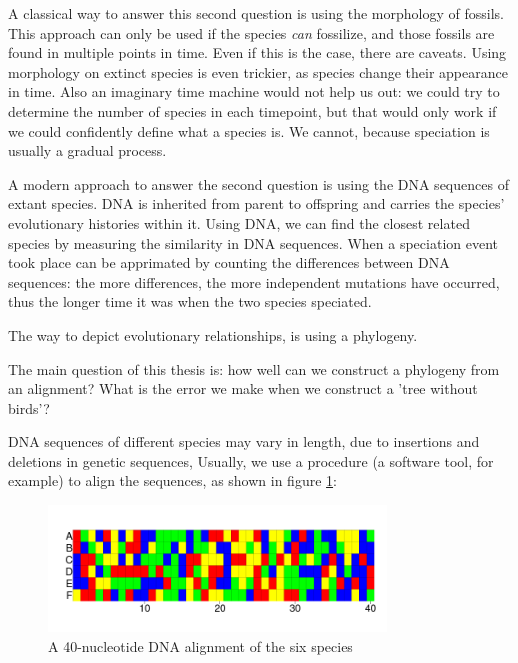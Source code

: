A classical way to answer this second question is using the morphology of fossils.
This approach can only be used if the species \emph{can} fossilize,
and those fossils are found in multiple points in time.
Even if this is the case, there are caveats. Using morphology on
extinct species is even trickier, as species change their appearance in time.
Also an imaginary time machine would not help us out:
we could try to determine the number of species in each timepoint,
but that would only work if we could confidently define what a
species is. We cannot, because speciation is usually a gradual process.

A modern approach to answer the second question is using the DNA
sequences of extant species. DNA is inherited from parent to offspring
and carries the species' evolutionary histories within it.
Using DNA, we can find the closest related species by measuring the
similarity in DNA sequences. When a speciation event took place can
be apprimated by counting the differences between DNA sequences: the
more differences, the more independent mutations have occurred, thus
the longer time it was when the two species speciated.

The way to depict evolutionary relationships, is using a phylogeny.



The main question of this thesis is: how well can we construct a
phylogeny from an alignment? What is the error we
make when we construct a 'tree without birds'?


DNA sequences of different species 
may vary in length, due to insertions and deletions in genetic sequences,
Usually, we use a procedure (a software tool, for example) to align 
the sequences, as shown in figure \ref{fig:alignment}:

\begin{figure}[H]
  \includegraphics[width=0.8\textwidth]{alignment_40.png}
  \caption{
    A 40-nucleotide DNA alignment of the six species
  }
  \label{fig:alignment}
\end{figure}




